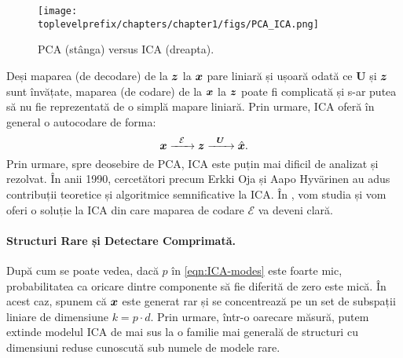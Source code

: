 \documentclass[../../book-main_ro.tex]{subfiles}
\begin{document}
\begin{figure}
    \centering
    \texttt{[image: \\toplevelprefix/chapters/chapter1/figs/PCA\_ICA.png]}
    \caption{PCA (stânga) versus ICA (dreapta).}
    \label{fig:ICA-PCA}
\end{figure}

Deși maparea (de decodare) de la $\bm{z}$ la $\bm{x}$ pare liniară și ușoară odată ce $\boldsymbol{U}$ și $\bm{z}$ sunt învățate, maparea (de codare) de la $\bm{x}$ la $\bm{z}$ poate fi complicată și s-ar putea să nu fie reprezentată de o simplă mapare liniară. Prin urmare, ICA oferă în general o autocodare de forma:
\begin{equation}
    \bm{x}   \xrightarrow{\hspace{2mm} \mathcal{E}\hspace{2mm}} \bm{z}  \xrightarrow{\hspace{2mm} \boldsymbol{U} \hspace{2mm}} \hat {\bm{x}}.
       \label{eqn:auto-encoding-ICA}
\end{equation}
Prin urmare, spre deosebire de PCA, ICA este puțin mai dificil de analizat și rezolvat. În anii 1990, cercetători precum Erkki Oja și Aapo Hyv\"{a}rinen \cite{hyvarinen-1997,Hyvrinen-2000} au adus contribuții teoretice și algoritmice semnificative la ICA. În , vom studia și vom oferi o soluție la ICA din care maparea de codare $\mathcal{E}$ va deveni clară.



\paragraph{Structuri Rare și Detectare Comprimată.}
După cum se poate vedea, dacă $p$ în \eqref{eqn:ICA-modes} este foarte mic, probabilitatea ca oricare dintre componente să fie diferită de zero este mică. În acest caz, spunem că $\bm{x}$ este generat rar și se concentrează pe un set de subspații liniare de dimensiune $k = p \cdot d$. Prin urmare, într-o oarecare măsură, putem extinde modelul ICA de mai sus la o familie mai generală de structuri cu dimensiuni reduse cunoscută sub numele de modele rare.
\end{document}
